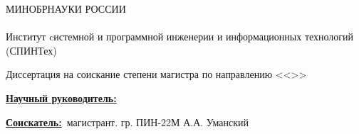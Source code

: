 \begin{frame}
    \begin{center}
        МИНОБРНАУКИ РОССИИ \\
        \thesisOrganization \\
        Институт cистемной и программной инженерии и информационных технологий (СПИНТех)
        \newline

        \textbf{\large \thesisTitle}
        \newline

        Диссертация на соискание степени магистра по направлению \thesisSpecialtyNumber <<\thesisSpecialtyTitle>>
    \end{center}

    \underline{\textbf{Научный руководитель:}}~\supervisorRegaliaShort~\supervisorFioShort

    \underline{\textbf{Соискатель:}}~магистрант. гр. ПИН-22М А.А. Уманский

\end{frame}
